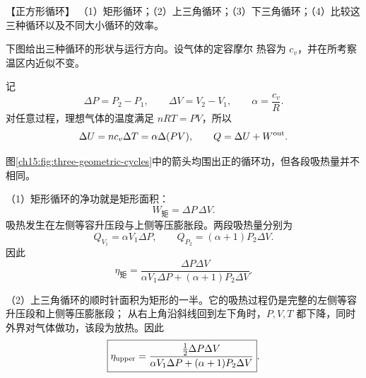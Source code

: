 {\begin{origexamplebox}{【正方形循环】}
（1）矩形循环；（2）上三角循环；（3）下三角循环；（4）比较这三种循环以及不同大小循环的效率。

下图给出三种循环的形状与运行方向。设气体的定容摩尔
热容为 $c_v$，并在所考察温区内近似不变。
\par\noindent\begin{minipage}{\linewidth}
\threeCyclesDiagram
{}\label{ch15:fig:three-geometric-cycles}
\end{minipage}\par\medskip
\end{origexamplebox}\par\nopagebreak[4]

\par\nopagebreak[4]\begin{xesolution}
\ThACycles

记
\begin{equation*}
  \Delta P=P_2-P_1,\qquad \Delta V=V_2-V_1,
  \qquad \alpha=\frac{c_v}{R}.
\end{equation*}
对任意过程，理想气体的温度满足 $nRT=PV$，所以
\begin{equation*}
  \Delta U=n c_v\Delta T=\alpha\Delta(PV),
  \qquad Q=\Delta U+W^{\rm out}.
\end{equation*}

图\ref{ch15:fig:three-geometric-cycles}中的箭头均围出正的循环功，但各段吸热量并不相同。

（1）矩形循环的净功就是矩形面积：
\begin{equation*}
  W_{\text{矩}}=\Delta P\,\Delta V.
\end{equation*}
吸热发生在左侧等容升压段与上侧等压膨胀段。两段吸热量分别为
\begin{equation*}
  Q_{V_1}=\alpha V_1\Delta P,
  \qquad
  Q_{P_2}=(\alpha+1)P_2\Delta V.
\end{equation*}
因此
\begin{equation}
  \boxed{\eta_{\text{矩}}=
  \frac{\Delta P\Delta V}
  {\alpha V_1\Delta P+(\alpha+1)P_2\Delta V}}.
\end{equation}

（2）上三角循环的顺时针面积为矩形的一半。它的吸热过程仍是完整的左侧等容升压段和上侧等压膨胀段；
从右上角沿斜线回到左下角时，$P,V,T$ 都下降，同时外界对气体做功，该段为放热。因此
\begin{equation}
  \boxed{\eta_{\rm upper}=
  \frac{\tfrac12\Delta P\Delta V}
  {\alpha V_1\Delta P+(\alpha+1)P_2\Delta V}}.
\end{equation}


\end{xesolution}}
